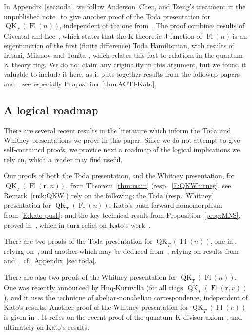 \documentclass[pdftex]{sigma}
\numberwithin{equation}{section}
\theoremstyle{definition}
\DeclareMathOperator{\Fl}{Fl}
\DeclareMathOperator{\QK}{QK}
\newcommand{\bfr}{{\mathbf r}}
\begin{document}
In Appendix~\ref{sec:toda}, we follow Anderson, Chen, and Tseng's
treatment in the unpublished
note~\cite{act:2017} to give another proof
of the Toda presentation for $\QK_T(\Fl(n))$,
independent of the one from~\cite{maeno.naito.sagaki:QKideal}.
The proof combines results of
Givental and Lee~\cite{givental_lee}, which
states that the K-theoretic J-function of $\Fl(n)$ is an eigenfunction of
the first (finite difference) Toda Hamiltonian, with results of Iritani, Milanov and Tonita
\cite{Iritani:2013qka}, which relates this fact to relations in the quantum
K theory ring. We do not claim any originality in this argument,
but we found it valuable to include it here, as it puts together results
from the followup papers~\cite{anderson2022finite} and~\cite{kato:loop}; see especially
Proposition~\ref{thm:ACTI-Kato}.

\subsection{A logical roadmap} There are several recent results in the literature which inform the Toda and Whitney
presentations we prove in this paper.
Since we do not attempt to give self-contained
proofs, we provide next a roadmap of the logical
implications we rely on, which a reader may find useful.

Our proofs of both the Toda presentation, and the Whitney presentation,
for $\QK_T(\Fl(\bfr,n))$, from Theorem~\ref{thm:main} (resp.\ \eqref{E:QKWhitney}, see Remark~\ref{rmk:QKW})
rely on the following: the Toda (resp.\ Whitney) presentation for $\QK_T(\Fl(n))$;
Kato's push forward homomorphism from~\eqref{E:kato-push}; and the key
technical result from Proposition~\ref{prop:MNS}, proved in~\cite{maeno.naito.sagaki:QKideal},
which in turn relies on Kato's work~\cite{kato:loop}.

There are two proofs of the Toda presentation for $\QK_T(\Fl(n))$, one in
\cite{maeno.naito.sagaki:QKideal}, relying on~\cite{kato:loop}, and another
which may be deduced from~\cite{act:2017}, relying on results from
\cite{givental_lee} and~\cite{Iritani:2013qka};~cf.~Appendix~\ref{sec:toda}.

There are also two proofs of the Whitney presentation for $\QK_T(\Fl(n))$.
One was recently announced by Huq-Kuruvilla
\cite{huq2024quantum} (for all rings $\QK_T(\Fl(\bfr,n))$), and
it uses the technique of abelian-nonabelian correspondence, independent
of Kato's results. Another proof of the Whitney presentation for
 $\QK_T(\Fl(n))$ is given in~\cite[Section~6]{GMSXZZ:QKW}.
It relies on the recent proof of the quantum~K divisor axiom~\cite{LNSX:QKdiv},
and ultimately on Kato's results.
\end{document}

